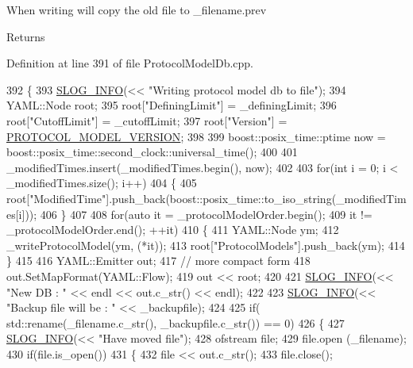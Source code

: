 When writing will copy the old file to \-\_\-filename.\-prev

\begin{DoxyReturn}{Returns}

\end{DoxyReturn}


Definition at line 391 of file Protocol\-Model\-Db.\-cpp.


\begin{DoxyCode}
392 \{
393     \hyperlink{_logger_8h_a119c1c29ba35a8db38e2358e41167282}{SLOG\_INFO}(<< \textcolor{stringliteral}{"Writing protocol model db to file"});
394     YAML::Node root;
395     root[\textcolor{stringliteral}{"DefiningLimit"}] = \_definingLimit;
396     root[\textcolor{stringliteral}{"CutoffLimit"}] = \_cutoffLimit;
397     root[\textcolor{stringliteral}{"Version"}] = \hyperlink{_protocol_model_db_8h_a92e0c4a4972115f1e9aec1a97d48eeb5}{PROTOCOL\_MODEL\_VERSION};
398 
399     boost::posix\_time::ptime now = boost::posix\_time::second\_clock::universal\_time();
400 
401     \_modifiedTimes.insert(\_modifiedTimes.begin(), now);
402 
403     \textcolor{keywordflow}{for}(\textcolor{keywordtype}{int} i = 0; i < \_modifiedTimes.size(); i++)
404     \{
405         root[\textcolor{stringliteral}{"ModifiedTime"}].push\_back(boost::posix\_time::to\_iso\_string(\_modifiedTimes[i]));
406     \}
407 
408     \textcolor{keywordflow}{for}(\textcolor{keyword}{auto} it = \_protocolModelOrder.begin(); 
409                 it != \_protocolModelOrder.end(); ++it)
410     \{
411         YAML::Node ym;
412         \_writeProtocolModel(ym, (*it));
413         root[\textcolor{stringliteral}{"ProtocolModels"}].push\_back(ym);
414     \}
415 
416     YAML::Emitter out;
417     \textcolor{comment}{// more compact form }
418     out.SetMapFormat(YAML::Flow);
419     out << root;
420 
421     \hyperlink{_logger_8h_a119c1c29ba35a8db38e2358e41167282}{SLOG\_INFO}(<< \textcolor{stringliteral}{"New DB : "} << endl << out.c\_str() << endl);
422 
423     \hyperlink{_logger_8h_a119c1c29ba35a8db38e2358e41167282}{SLOG\_INFO}(<< \textcolor{stringliteral}{"Backup file will be : "} << \_backupfile);
424 
425     \textcolor{keywordflow}{if}( std::rename(\_filename.c\_str(), \_backupfile.c\_str()) == 0)
426     \{
427         \hyperlink{_logger_8h_a119c1c29ba35a8db38e2358e41167282}{SLOG\_INFO}(<< \textcolor{stringliteral}{"Have moved file"});
428         ofstream file;
429         file.open (\_filename);
430         \textcolor{keywordflow}{if}(file.is\_open())
431         \{
432             file << out.c\_str();
433             file.close();

\end{DoxyCode}
